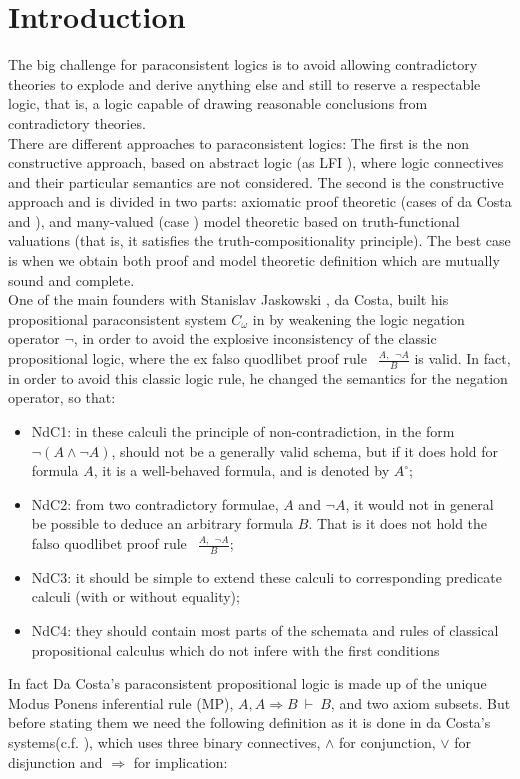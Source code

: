 \documentclass{llncs}
\begin{document}
\section{Introduction}
The big challenge for paraconsistent logics is to avoid
 allowing contradictory theories to explode and derive anything else
 and still to reserve a respectable logic, that is, a logic capable of drawing reasonable
 conclusions from  contradictory theories.\\
   There are different approaches to paraconsistent logics: The first is the non constructive approach, based on abstract logic
 (as LFI \cite{CaCM06}), where  logic connectives and their
 particular semantics are not considered. The second is the constructive approach and is divided in
 two parts: axiomatic proof theoretic (cases of da Costa \cite{Costa74} and
 \cite{AnBe75,Bate80,Bate00}),  and many-valued
 (case \cite{Majk06ml}) model theoretic based on truth-functional valuations (that
 is, it satisfies the truth-compositionality principle). The best
 case is when we obtain both proof and model theoretic definition which are mutually sound and
 complete.\\
 One of the main founders with Stanislav Jaskowski \cite{Jask48}, da
Costa,  built his propositional paraconsistent system $C_\omega$ in
\cite{Costa74} by weakening the logic negation operator $\neg$, in
order to avoid the explosive inconsistency \cite{CaCM06,CaMa02} of
the classic propositional logic, where  the ex falso quodlibet proof
rule $~~\frac{A, ~~\neg A}{B}$ is valid. In fact, in order to avoid
this classic logic rule, he changed the semantics for the negation
operator, so that:
\begin{itemize}
  \item NdC1:  in these calculi the principle of non-contradiction,
  in the form $\neg(A \wedge \neg A)$, should not be a generally valid
  schema, but if it does hold for  formula $A$, it is a well-behaved
  formula, and is denoted by $A^\circ$;
  \item NdC2: from two contradictory formulae, $A$ and $\neg A$, it
  would not in general be possible to deduce an arbitrary formula
  $B$. That is it does not hold the falso
quodlibet proof rule $~~\frac{A, ~~\neg A}{B}$;
  \item NdC3: it should be simple to extend these calculi to corresponding
  predicate calculi (with or without equality);
  \item NdC4: they should contain  most parts of the schemata and
  rules of  classical propositional calculus which do not infere
  with the first conditions
\end{itemize}
In fact Da Costa's paraconsistent propositional logic is made up of
the unique Modus Ponens inferential rule (MP), $A, A \Rightarrow B
~\vdash ~B$, and two axiom subsets. But before stating them we need
the following definition as it is done in da Costa's systems(c.f.
\cite[p.500]{Costa74}), which uses three binary connectives,
$\wedge$ for conjunction, $\vee$ for disjunction and $\Rightarrow$
for implication:
\end{document}
